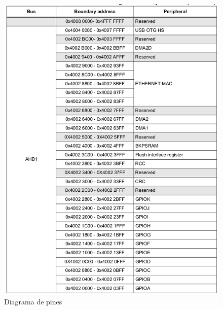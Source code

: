 \begin{figure}[H]
\centering
\includegraphics[scale=0.6]{./images/r2.png} 
\caption{Diagrama de pines \cite{DiscoveryDATASHEET}}
\label{gyro_pins}
\end{figure}